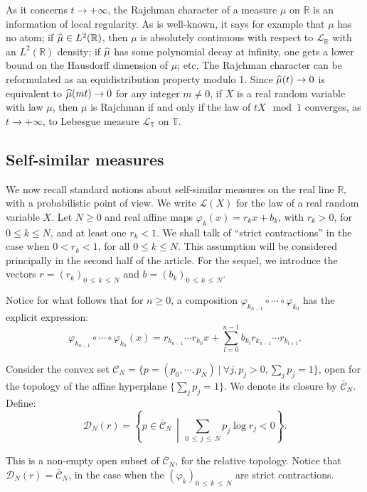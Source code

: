 \documentclass[AHL,Unicode,longabstracts,published]{cedram}
\newcommand{\Tbb}{\mathbb T}
\newcommand{\Rbb}{\mathbb R}
\newcommand{\Lcl}{\mathcal{L}}
\newcommand{\Ccl}{\mathcal{C}}
\newcommand{\Dcl}{\mathcal{D}}
\let\oldhat\hat
\renewcommand*{\hat}[1]{\mathchoice{\widehat{#1}}{\widehat{#1}}{\oldhat{#1}}{\oldhat{#1}}}
\let\oldforall\forall
\renewcommand*{\forall}{\mathrel{\oldforall}}
\begin{document}
As it concerns $t\rightarrow+\infty$, the Rajchman character of a measure $\mu$ on $\Rbb$ is an information of local regularity. As is well-known, it says for example that $\mu$ has no atom; if $\hat{\mu}\in L^2(\Rbb)$, then $\mu$ is absolutely continuous with respect to ${\Lcl}_{\Rbb}$ with an $L^2(\Rbb)$ density; if $\hat{\mu}$ has some polynomial decay at infinity, one gets a lower bound on the Hausdorff dimension of $\mu$; etc. The Rajchman character can be reformulated as an equidistribution property modulo 1. Since $\hat{\mu}(t)\rightarrow0$ is equivalent to $\hat{\mu}(mt)\rightarrow0$ for any integer $m\not=0$, if $X$ is a real random variable with law $\mu$, then $\mu$ is Rajchman if and only if the law of $tX\mod 1$ converges, as $t\rightarrow+\infty$, to Lebesgue measure ${\Lcl}_{\Tbb}$ on $\Tbb$.

\subsection*{Self-similar measures}
We now recall standard notions about self-similar measures on the real line $\Rbb$, with a probabilistic point of view. We write ${\Lcl}(X)$ for the law of a real random variable $X$. Let $N\geq0$ and real affine maps $\varphi_k(x)=r_kx+b_k$, with $r_k>0$, for $0\leq k\leq N$, and at least one $r_k<1$. We shall talk of ``strict contractions'' in the case when $0<r_k<1$, for all $0\leq k\leq N$. This assumption will be considered principally in the second half of the article. For the sequel, we introduce the vectors $r=(r_k)_{0\,\leq\,k\,\leq\,N}$ and $b=(b_k)_{0\,\leq\,k\,\leq\, N}$.


Notice for what follows that for $n\geq0$, a composition $\varphi_{k_{n-1}}\circ \cdots \circ\varphi_{k_0}$ has the explicit expression:
\[
\varphi_{k_{n-1}}\circ \cdots \circ\varphi_{k_0}(x)=r_{k_{n-1}}\cdots r_{ k_0}x+\sum_{l=0}^{n-1}b_{k_l}r_{k_{n-1}}\cdots r_{k_{l+1}}.
\]


Consider the convex set ${\Ccl}_N=\{p=(p_0,\cdots,p_N)~|~\forall j, p_j>0, \sum_jp_j=1\}$, open for the topology of the affine hyperplane $\{\sum_jp_j=1\}$. We denote its closure by $\bar{{\Ccl}}_N$. Define:
\[
{\Dcl}_N(r)=\left\{p\in\bar{{\Ccl}}_N\,\middle|\,\sum_{0\,\leq\,j\,\leq\,N}p_j\log r_j<0\right\}.
\]


This is a non-empty open subset of $\bar{{\Ccl}}_N$, for the relative topology. Notice that ${\Dcl}_N(r)=\bar{{\Ccl}}_N$, in the case when the $(\varphi_k)_{0\,\leq\,k\,\leq\,N}$ are strict contractions.
\end{document}

